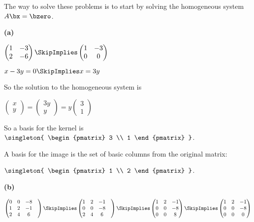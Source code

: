 \documentclass[oneside,12pt]{amsart}
\begin{document}
The way to solve these problems is to start by solving the homogeneous
system $A\bx=\bzero$.


\bigskip

\textbf{(a)}

\bigskip

$
\begin{pmatrix}
1 & -3 \\
2 & -6
\end{pmatrix}
\SkipImplies
\begin{pmatrix}
1 & -3 \\
0 & 0
\end{pmatrix}
$

\bigskip

$x - 3y = 0 \SkipImplies x = 3y$

\bigskip

So the solution to the homogeneous system is

$
\begin{pmatrix}
x \\
y
\end{pmatrix}
=
\begin{pmatrix}
3y \\ y
\end{pmatrix}
=
y
\begin{pmatrix}
3 \\ 1
\end{pmatrix}
$

So a basis for the kernel is
$\singleton{
\begin{pmatrix}
3 \\ 1
\end{pmatrix}
}$.

A basis for the image is the set of basic columns from the original matrix:

$\singleton{
\begin{pmatrix}
1 \\ 2
\end{pmatrix}
}$.

\bigskip

\textbf{(b)}

\bigskip

$
\begin{pmatrix}
0 & 0 & -8  \\
1 & 2 & -1  \\
2 & 4 & 6 &
\end{pmatrix}
\SkipImplies
\begin{pmatrix}
1 & 2 & -1  \\
0 & 0 & -8  \\
2 & 4 &  6 &
\end{pmatrix}
\SkipImplies
\begin{pmatrix}
1 & 2 & -1 \\
0 & 0 & -8 \\
0 & 0 &  8
\end{pmatrix}
\SkipImplies
\begin{pmatrix}
1 & 2 & -1 \\
0 & 0 & -8 \\
0 & 0 &  0
\end{pmatrix}
$
\end{document}
